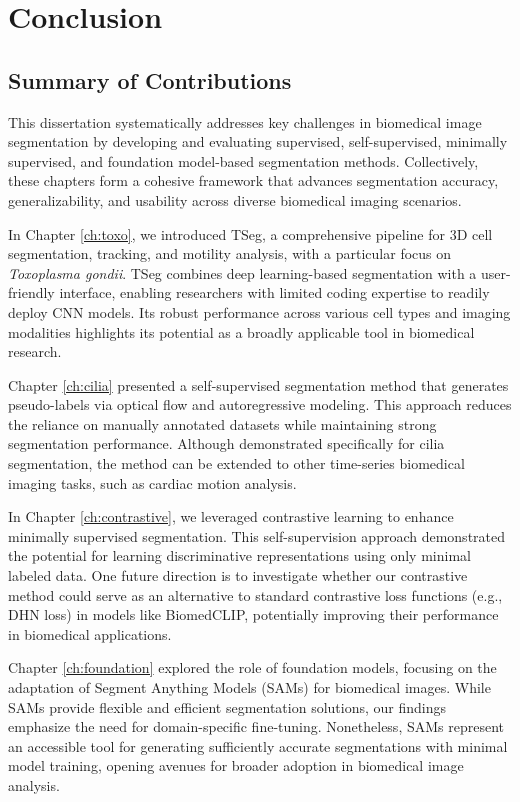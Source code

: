 \documentclass[./dissertation.tex]{subfiles}
\begin{document}
\chapter{Conclusion}
\label{ch:conclusion}

\section{Summary of Contributions}
This dissertation systematically addresses key challenges in biomedical image segmentation by developing and evaluating supervised, self-supervised, minimally supervised, and foundation model-based segmentation methods. Collectively, these chapters form a cohesive framework that advances segmentation accuracy, generalizability, and usability across diverse biomedical imaging scenarios.

In Chapter \ref{ch:toxo}, we introduced TSeg, a comprehensive pipeline for 3D cell segmentation, tracking, and motility analysis, with a particular focus on \textit{Toxoplasma gondii}. TSeg combines deep learning-based segmentation with a user-friendly interface, enabling researchers with limited coding expertise to readily deploy CNN models. Its robust performance across various cell types and imaging modalities highlights its potential as a broadly applicable tool in biomedical research.

Chapter \ref{ch:cilia} presented a self-supervised segmentation method that generates pseudo-labels via optical flow and autoregressive modeling. This approach reduces the reliance on manually annotated datasets while maintaining strong segmentation performance. Although demonstrated specifically for cilia segmentation, the method can be extended to other time-series biomedical imaging tasks, such as cardiac motion analysis.

In Chapter \ref{ch:contrastive}, we leveraged contrastive learning to enhance minimally supervised segmentation. This self-supervision approach demonstrated the potential for learning discriminative representations using only minimal labeled data. One future direction is to investigate whether our contrastive method could serve as an alternative to standard contrastive loss functions (e.g., DHN loss) in models like BiomedCLIP, potentially improving their performance in biomedical applications.

Chapter \ref{ch:foundation} explored the role of foundation models, focusing on the adaptation of Segment Anything Models (SAMs) for biomedical images. While SAMs provide flexible and efficient segmentation solutions, our findings emphasize the need for domain-specific fine-tuning. Nonetheless, SAMs represent an accessible tool for generating sufficiently accurate segmentations with minimal model training, opening avenues for broader adoption in biomedical image analysis.
\end{document}
